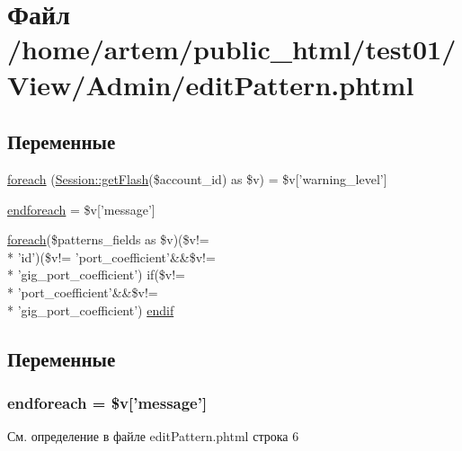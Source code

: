 \hypertarget{edit_pattern_8phtml}{\section{Файл /home/artem/public\-\_\-html/test01/\-View/\-Admin/edit\-Pattern.phtml}
\label{edit_pattern_8phtml}
}
\subsection*{Переменные}
\begin{DoxyCompactItemize}
\item 
\hyperlink{edit_pattern_8phtml_ad2ad89e7e9ce5abc946b77f97427ae34}{foreach} (\hyperlink{class_session_ae4c4b98671bdd1fbfe4ae9defb5405ad}{Session\-::get\-Flash}(\$account\-\_\-id) as \$v) = \$v\mbox{[}'warning\-\_\-level'\mbox{]}
\item 
\hyperlink{edit_pattern_8phtml_a672d9707ef91db026c210f98cc601123}{endforeach} = \$v\mbox{[}'message'\mbox{]}
\item 
\hyperlink{snmp_switch_data_8phtml_a1aebcd3bfc8b09c505928fe2958e6143}{foreach}(\$patterns\-\_\-fields as \$v)(\$v!= \\*
'id')(\$v!= 'port\-\_\-coefficient'\&\&\$v!= \\*
'gig\-\_\-port\-\_\-coefficient') if(\$v!= \\*
'port\-\_\-coefficient'\&\&\$v!= \\*
'gig\-\_\-port\-\_\-coefficient') \hyperlink{edit_pattern_8phtml_afd53a91464451c8aabda435ff44bd275}{endif}
\end{DoxyCompactItemize}


\subsection{Переменные}
\hypertarget{edit_pattern_8phtml_a672d9707ef91db026c210f98cc601123}{
\subsubsection[{endforeach}]{\setlength{\rightskip}{0pt plus 5cm}endforeach = \$v\mbox{[}'message'\mbox{]}}}\label{edit_pattern_8phtml_a672d9707ef91db026c210f98cc601123}


См. определение в файле edit\-Pattern.\-phtml строка 6

